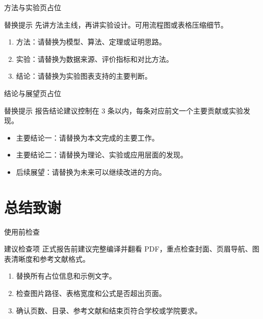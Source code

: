 \documentclass[12pt,aspectratio=43]{beamer}
\newcommand{\SUSTSectionTitleSix}{总结致谢}
\begin{document}
\begin{frame}{方法与实验页占位}
  \begin{block}{替换提示}
    先讲方法主线，再讲实验设计。可用流程图或表格压缩细节。
  \end{block}

  \begin{enumerate}
    \item 方法：请替换为模型、算法、定理或证明思路。
    \item 实验：请替换为数据来源、评价指标和对比方法。
    \item 结论：请替换为实验图表支持的主要判断。
  \end{enumerate}
\end{frame}

\begin{frame}{结论与展望页占位}
  \begin{block}{替换提示}
    报告结论建议控制在 3 条以内，每条对应前文一个主要贡献或实验发现。
  \end{block}

  \begin{itemize}
    \item 主要结论一：请替换为本文完成的主要工作。
    \item 主要结论二：请替换为理论、实验或应用层面的发现。
    \item 后续展望：请替换为未来可以继续改进的方向。
  \end{itemize}
\end{frame}

\section{\SUSTSectionTitleSix}

\begin{frame}{使用前检查}
  \begin{block}{建议检查项}
    正式报告前建议完整编译并翻看 PDF，重点检查封面、页眉导航、图表清晰度和参考文献格式。
  \end{block}

  \begin{enumerate}
    \item 替换所有占位信息和示例文字。
    \item 检查图片路径、表格宽度和公式是否超出页面。
    \item 确认页数、目录、参考文献和结束页符合学校或学院要求。
  \end{enumerate}
\end{frame}
\end{document}

